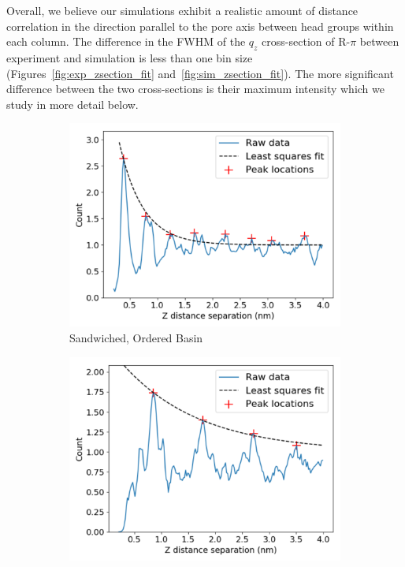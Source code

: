 \documentclass[journal=jpcbfk,manuscript=article]{achemso}
\begin{document}
  Overall, we believe our simulations exhibit a realistic amount of distance
  correlation in the direction parallel to the pore axis between head groups
  within each column. The difference in the FWHM of the $q_z$ cross-section of
  R-$\pi$ between experiment and simulation is less than one bin size
  (Figures~\ref{fig:exp_zsection_fit} and~\ref{fig:sim_zsection_fit}). The more
  significant difference between the two cross-sections is their maximum intensity
  which we study in more detail below.
  
  \begin{figure}[!htb]
  \centering
  \begin{subfigure}{0.45\textwidth}
  \centering
  \includegraphics[width=\textwidth]{z_correlation_sandwich.pdf}
  \caption{Sandwiched, Ordered Basin}\label{fig:z_correlation_sandwich}
  \end{subfigure}  
  \begin{subfigure}{0.45\textwidth}
  \centering
  \includegraphics[width=\textwidth]{z_correlation_offset.pdf}

\end{subfigure}
\end{figure}
\end{document}
